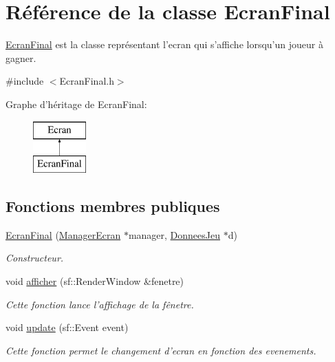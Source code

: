 \hypertarget{classEcranFinal}{\section{\-Référence de la classe \-Ecran\-Final}
\label{classEcranFinal}
}


\hyperlink{classEcranFinal}{\-Ecran\-Final} est la classe représentant l'ecran qui s'affiche lorsqu'un joueur à gagner.  




{\ttfamily \#include $<$\-Ecran\-Final.\-h$>$}

\-Graphe d'héritage de \-Ecran\-Final\-:\begin{figure}[H]
\begin{center}
\leavevmode
\includegraphics[height=2.000000cm]{classEcranFinal}
\end{center}
\end{figure}
\subsection*{\-Fonctions membres publiques}
\begin{DoxyCompactItemize}
\item 
\hypertarget{classEcranFinal_aceb5934bfd3afcf020a6628e00538a56}{\hyperlink{classEcranFinal_aceb5934bfd3afcf020a6628e00538a56}{\-Ecran\-Final} (\hyperlink{classManagerEcran}{\-Manager\-Ecran} $\ast$manager, \hyperlink{classDonneesJeu}{\-Donnees\-Jeu} $\ast$d)}\label{classEcranFinal_aceb5934bfd3afcf020a6628e00538a56}

\begin{DoxyCompactList}\small\item\em \-Constructeur. \end{DoxyCompactList}\item 
void \hyperlink{classEcranFinal_a1643c9d5712d527559d05ba548e7e6fc}{afficher} (sf\-::\-Render\-Window \&fenetre)
\begin{DoxyCompactList}\small\item\em \-Cette fonction lance l'affichage de la fênetre. \end{DoxyCompactList}\item 
void \hyperlink{classEcranFinal_a35714c3da483c95442106381041b53a6}{update} (sf\-::\-Event event)
\begin{DoxyCompactList}\small\item\em \-Cette fonction permet le changement d'ecran en fonction des evenements. \end{DoxyCompactList}\end{DoxyCompactItemize}


